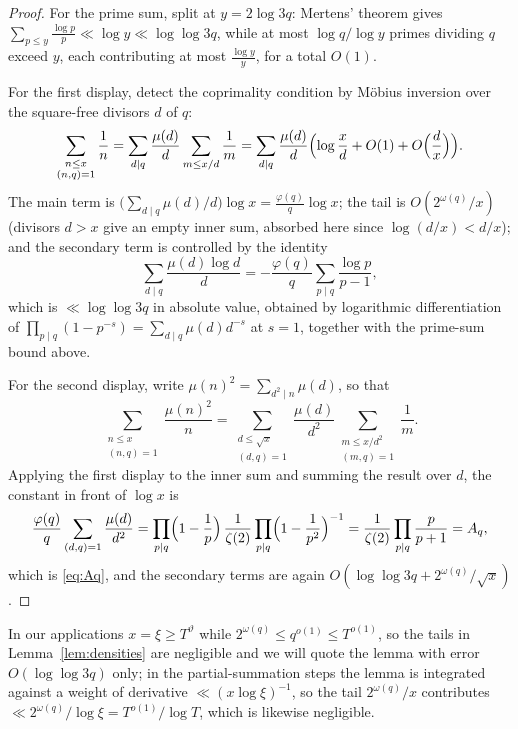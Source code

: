 \documentclass[12pt,a4paper,reqno]{amsart}
\theoremstyle{remark}
\numberwithin{equation}{section}
\begin{document}
\begin{proof}
For the prime sum, split at $y=2\log 3q$: Mertens' theorem gives $\sum_{p\le y}\frac{\log p}{p}\ll\log y\ll\log\log 3q$, while at most $\log q/\log y$ primes dividing $q$ exceed $y$, each contributing at most $\frac{\log y}{y}$, for a total $O(1)$.

For the first display, detect the coprimality condition by M\"obius inversion over the square-free divisors $d$ of $q$:
\[
\sum_{\substack{n\le x\\(n,q)=1}}\frac1n=\sum_{d\mid q}\frac{\mu(d)}{d}\sum_{m\le x/d}\frac1m
=\sum_{d\mid q}\frac{\mu(d)}{d}\Bigl(\log\frac xd+O(1)+O\Bigl(\frac dx\Bigr)\Bigr).
\]
The main term is $\bigl(\sum_{d\mid q}\mu(d)/d\bigr)\log x=\frac{\varphi(q)}{q}\log x$; the tail is $O(2^{\omega(q)}/x)$ (divisors $d>x$ give an empty inner sum, absorbed here since $\log(d/x)<d/x$); and the secondary term is controlled by the identity
\[
\sum_{d\mid q}\frac{\mu(d)\log d}{d}=-\frac{\varphi(q)}{q}\sum_{p\mid q}\frac{\log p}{p-1},
\]
which is $\ll\log\log 3q$ in absolute value, obtained by logarithmic differentiation of $\prod_{p\mid q}(1-p^{-s})=\sum_{d\mid q}\mu(d)d^{-s}$ at $s=1$, together with the prime-sum bound above.

For the second display, write $\mu(n)^2=\sum_{d^2\mid n}\mu(d)$, so that
\[
\sum_{\substack{n\le x\\(n,q)=1}}\frac{\mu(n)^2}{n}=\sum_{\substack{d\le\sqrt x\\(d,q)=1}}\frac{\mu(d)}{d^2}\sum_{\substack{m\le x/d^2\\(m,q)=1}}\frac1m .
\]
Applying the first display to the inner sum and summing the result over $d$, the constant in front of $\log x$ is
\[
\frac{\varphi(q)}{q}\sum_{(d,q)=1}\frac{\mu(d)}{d^2}
=\prod_{p\mid q}\Bigl(1-\frac1p\Bigr)\,\frac{1}{\zeta(2)}\prod_{p\mid q}\Bigl(1-\frac1{p^2}\Bigr)^{-1}
=\frac{1}{\zeta(2)}\prod_{p\mid q}\frac{p}{p+1}=A_q,
\]
which is \eqref{eq:Aq}, and the secondary terms are again $O(\log\log 3q+2^{\omega(q)}/\sqrt x)$.
\end{proof}

In our applications $x=\xi\ge T^{\vartheta}$ while $2^{\omega(q)}\le q^{o(1)}\le T^{o(1)}$, so the tails in Lemma~\ref{lem:densities} are negligible and we will quote the lemma with error $O(\log\log 3q)$ only; in the partial-summation steps the lemma is integrated against a weight of derivative $\ll(x\log\xi)^{-1}$, so the tail $2^{\omega(q)}/x$ contributes $\ll 2^{\omega(q)}/\log\xi=T^{o(1)}/\log T$, which is likewise negligible.
\end{document}
